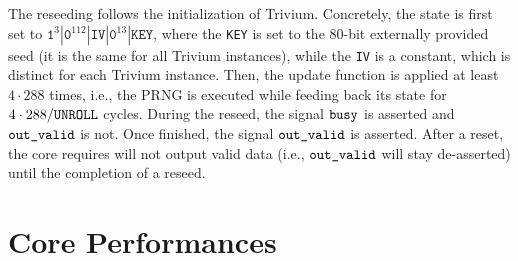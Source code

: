 \documentclass{scrartcl}
\begin{document}
The reseeding follows the initialization of Trivium. Concretely, the state is
first set to
$\texttt{1}^3|\texttt{0}^{112}|\texttt{IV}|\texttt{0}^{13}|\texttt{KEY}$, where
the \texttt{KEY} is set to the 80-bit externally provided seed (it is
the same for all Trivium instances), while the \texttt{IV} is a constant, which
is distinct for each Trivium instance.  Then, the update function is applied at
least $4\cdot 288$ times, i.e., the PRNG is executed while feeding back its
state for $4\cdot 288 / \texttt{UNROLL}$ cycles.  During the reseed, the signal
$\texttt{busy}$ is asserted and $\texttt{out\_valid}$ is not. Once finished, the
signal $\texttt{out\_valid}$ is asserted.  After a reset, the core requires will
not output valid data (i.e., $\texttt{out\_valid}$ will stay de-asserted) until
the completion of a reseed.
  
\section{Core Performances}
\end{document}
